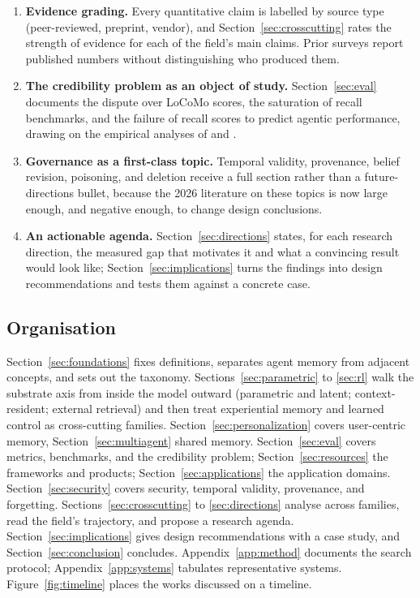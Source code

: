 \documentclass[11pt]{article}
\begin{document}
\begin{enumerate}
\item \textbf{Evidence grading.} Every quantitative claim is labelled by source type (peer-reviewed, preprint, vendor), and Section~\ref{sec:crosscutting} rates the strength of evidence for each of the field's main claims. Prior surveys report published numbers without distinguishing who produced them.
\item \textbf{The credibility problem as an object of study.} Section~\ref{sec:eval} documents the dispute over LoCoMo scores, the saturation of recall benchmarks, and the failure of recall scores to predict agentic performance, drawing on the empirical analyses of \citet{jiang2026anatomy} and \citet{spencer2026groundtruth}.
\item \textbf{Governance as a first-class topic.} Temporal validity, provenance, belief revision, poisoning, and deletion receive a full section rather than a future-directions bullet, because the 2026 literature on these topics is now large enough, and negative enough, to change design conclusions.
\item \textbf{An actionable agenda.} Section~\ref{sec:directions} states, for each research direction, the measured gap that motivates it and what a convincing result would look like; Section~\ref{sec:implications} turns the findings into design recommendations and tests them against a concrete case.
\end{enumerate}

\subsection{Organisation}

Section~\ref{sec:foundations} fixes definitions, separates agent memory from adjacent concepts, and sets out the taxonomy. Sections~\ref{sec:parametric} to \ref{sec:rl} walk the substrate axis from inside the model outward (parametric and latent; context-resident; external retrieval) and then treat experiential memory and learned control as cross-cutting families. Section~\ref{sec:personalization} covers user-centric memory, Section~\ref{sec:multiagent} shared memory. Section~\ref{sec:eval} covers metrics, benchmarks, and the credibility problem; Section~\ref{sec:resources} the frameworks and products; Section~\ref{sec:applications} the application domains. Section~\ref{sec:security} covers security, temporal validity, provenance, and forgetting. Sections~\ref{sec:crosscutting} to \ref{sec:directions} analyse across families, read the field's trajectory, and propose a research agenda. Section~\ref{sec:implications} gives design recommendations with a case study, and Section~\ref{sec:conclusion} concludes. Appendix~\ref{app:method} documents the search protocol; Appendix~\ref{app:systems} tabulates representative systems. Figure~\ref{fig:timeline} places the works discussed on a timeline.
\end{document}
